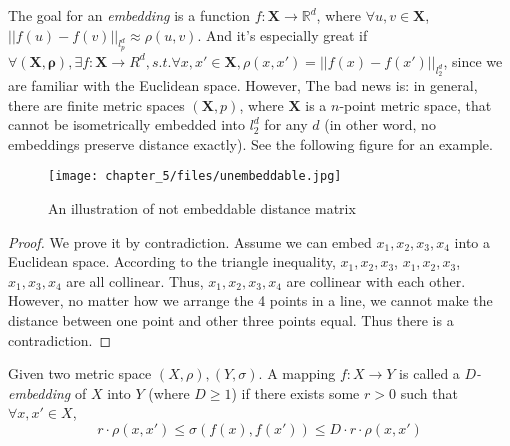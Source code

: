 The goal for an \emph{embedding} is a function
$f:\mathbf{X}\rightarrow \mathbb{R}^d$, where $\forall u,v \in
\mathbf{X}$, $||f(u)-f(v)||_{l_p^d} \approx \rho(u,v)$. And it's especially great if $\forall \mathbf{(X,\rho)}, \exists f:\mathbf{X}\rightarrow R^d, s.t. \forall x, x' \in \mathbf{X}, \rho(x,x')=||f(x)-f(x')||_{l_2^d}$, since we are familiar with the Euclidean space. However,
The bad news is: in general, there are finite metric spaces
$(\mathbf{X},p)$, where $\mathbf{X}$ is a $n$-point metric space, that
cannot be isometrically embedded into $l_2^d$ for any $d$ (in other
word, no embeddings preserve distance exactly). See the following
figure for an example. \\
\begin{figure}[h!]
\begin{center}
\texttt{[image: chapter\_5/files/unembeddable.jpg]}
\caption{An illustration of not embeddable distance matrix}
\end{center}
\end{figure}
\begin{proof}
We prove it by contradiction. Assume we can embed $x_1, x_2, x_3, x_4$ into a Euclidean space. According to the triangle inequality,  $x_1 ,x_2, x_3$, $x_1, x_2, x_3$, $x_1, x_3, x_4$ are all collinear. Thus, $x_1, x_2, x_3, x_4$ are collinear with each other. However, no matter how we arrange the 4 points in a line, we cannot make the distance between one point and other three points equal. Thus there is a contradiction.
\end{proof}
\begin{definition}
Given two metric space $(X,\rho), (Y,\sigma)$. A mapping $f:
X\rightarrow Y$ is called a \emph{$D$-embedding} of $X$ into $Y$
(where $D\geq 1$) if there exists some $r>0$ such that $\forall x,x'
\in X$, 
\[
r \cdot \rho(x,x') \leq \sigma(f(x),f(x')) \leq D \cdot r \cdot
\rho(x,x') 
\]
\end{definition}
